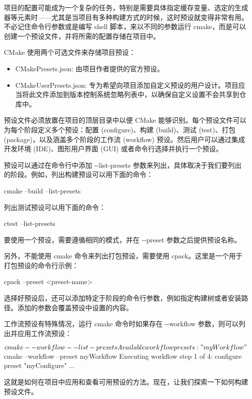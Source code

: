 项目的配置可能成为一个复杂的任务，特别是需要具体指定缓存变量、选定的生成器等元素时——尤其是当项目有多种构建方式的时候，这时预设就变得非常有用。不必记住命令行参数或是编写 shell 脚本，来以不同的参数运行 cmake，而是可以创建一个预设文件，并将所需的配置存储在项目中。

CMake 使用两个可选文件来存储项目预设：

\begin{itemize}
\item
CMakePresets.json: 由项目作者提供的官方预设。

\item
CMakeUserPresets.json: 专为希望向项目添加自定义预设的用户设计。项目应当将此文件添加到版本控制系统忽略列表中，以确保自定义设置不会共享到仓库中。
\end{itemize}

预设文件必须放置在项目的顶层目录中以便 CMake 能够识别。每个预设文件可以为每个阶段定义多个预设：配置 (configure)、构建 (build)、测试 (test)、打包 (package)，以及涵盖多个阶段的工作流 (workflow) 预设。然后用户可以通过集成开发环境 (IDE)、图形用户界面 (GUI) 或者命令行选择并执行一个预设。

预设可以通过在命令行中添加 -{}-list-presets 参数来列出，具体取决于我们要列出的阶段。例如，列出构建预设可以用下面的命令：

\begin{shell}
cmake --build --list-presets
\end{shell}

列出测试预设可以用下面的命令：

\begin{shell}
ctest --list-presets
\end{shell}

要使用一个预设，需要遵循相同的模式，并在 -{}-preset 参数之后提供预设名称。

另外，不能使用 cmake 命令来列出打包预设，需要使用 cpack。这里是一个用于打包预设的命令行示例：

\begin{shell}
cpack --preset <preset-name>
\end{shell}

选择好预设后，还可以添加特定于阶段的命令行参数，例如指定构建树或者安装路径。添加的参数会覆盖预设中设置的内容。

工作流预设有特殊情况，运行 cmake 命令时如果存在 -{}-workflow 参数，则可以列出并应用工作流预设：

\begin{shell}
$ cmake --workflow --list-presets
Available workflow presets:
    "myWorkflow"
$ cmake --workflow --preset myWorkflow
Executing workflow step 1 of 4: configure preset "myConfigure"
...
\end{shell}

这就是如何在项目中应用和查看可用预设的方法。现在，让我们探索一下如何构建预设文件。


























